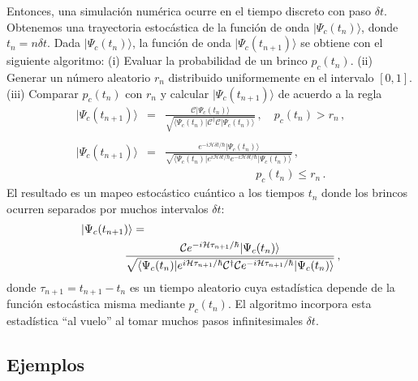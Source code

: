 \documentclass[twocolumn,aps,eqsecnum,showkeys,amsmath]{revtex4}
\newcommand{\mcC}{\mathcal{C}}
\newcommand{\mcH}{\mathcal{H}} 	%
\providecommand{\bra}[1]{\langle #1 \rvert}
\providecommand{\ket}[1]{\lvert #1 \rangle}
\begin{document}
Entonces, una simulaci\'on num\'erica ocurre en el tiempo discreto con 
paso $\delta t$. Obtenemos una trayectoria estoc\'astica de la funci\'on 
de onda $\ket{\Psi_c (t_n)}$, donde $t_n = n \delta t$. Dada 
$\ket{\Psi_c (t_n)}$, la funci\'on de onda $\ket{\Psi_c (t_{n+1})}$ se obtiene 
con el siguiente algoritmo: 
\newline (i) Evaluar la probabilidad de un brinco $p_c (t_n)$. 
\newline (ii) Generar un n\'umero aleatorio $r_n$ distribuido uniformemente en el intervalo $[0,1]$. 
\newline (iii) Comparar $p_c(t_n)$ con $r_n$ y calcular  $\ket{\Psi_c (t_{n+1})}$ 
de acuerdo a la regla   
\begin{subequations}
\begin{eqnarray} 	%
\ket{\Psi_c(t_{n+1}) } &=& \frac{\mcC \ket{\Psi_c(t_n) } } 
	{\sqrt{\bra{\Psi_c(t_n)} \mcC^\dag \mcC \ket{\Psi_c(t_n)} } } \,, 		
	\quad p_c (t_n) > r_n \,, 	\nonumber \\ \\ 
\ket{\Psi_c(t_{n+1}) } 
	&=& \frac{ e^{- i \mcH \delta t /\hbar} \ket{ \Psi_c(t_n) } } 
	{\sqrt{\bra{\Psi_c(t_n)} e^{ i \mcH \delta t /\hbar} 
	e^{- i \mcH \delta t /\hbar} \ket{\Psi_c(t_n)} } } 	\,,	\nonumber \\ 
	&& \qquad  \qquad  \qquad  \qquad p_c (t_n) \leq r_n \,. 	
\end{eqnarray}
\end{subequations}
El resultado es un mapeo estoc\'astico cu\'antico a los tiempos $t_n$ donde  
los brincos ocurren separados por muchos intervalos $\delta t$: 
\begin{eqnarray} 	
\lefteqn{ \ket{\Psi_c(t_{n+1}) } =} \hspace{1cm} \nonumber \\
	&& \frac{ \mcC e^{- i \mcH \tau_{n+1} /\hbar} \ket{\Psi_c(t_n) } } 
	{\sqrt{\bra{\Psi_c(t_n)} e^{ i \mcH \tau_{n+1} /\hbar} \mcC^\dag 		
	\mcC e^{- i \mcH \tau_{n+1} /\hbar} \ket{\Psi_c(t_n)} } } 	\,,	
	\nonumber \\
\end{eqnarray}
donde $\tau_{n+1} = t_{n+1} -t_n$ es un tiempo aleatorio cuya 
estad\'istica depende de la funci\'on estoc\'astica misma mediante 
$p_c (t_n)$. El algoritmo incorpora esta estad\'istica ``al vuelo'' al 
tomar muchos pasos infinitesimales $\delta t$. 

\subsection{Ejemplos}
\end{document}
